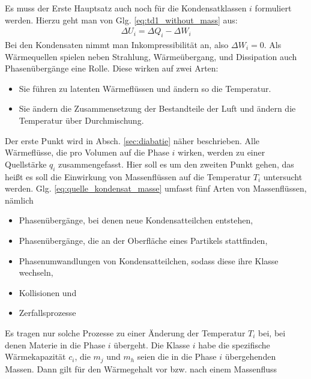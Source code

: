 \documentclass{book}
\begin{document}
Es muss der Erste Hauptsatz auch noch für die Kondensatklassen $i$ formuliert werden. Hierzu geht man von Glg. \eqref{eq:td1_without_mass} aus:
%
\begin{eqnarray}
\Delta U_i = \Delta Q_i - \Delta W_i
\end{eqnarray}
%
Bei den Kondensaten nimmt man Inkompressibilität an, also $\Delta W_i = 0$. Als Wärmequellen spielen neben Strahlung, Wärmeübergang, und Dissipation auch Phasenübergänge eine Rolle. Diese wirken auf zwei Arten:
%
\begin{itemize}
\item Sie führen zu latenten Wärmeflüssen und ändern so die Temperatur.
\item Sie ändern die Zusammensetzung der Bestandteile der Luft und ändern die Temperatur über Durchmischung.
\end{itemize}
%
Der erste Punkt wird in Absch. \ref{sec:diabatie} näher beschrieben. Alle Wärmeflüsse, die pro Volumen auf die Phase $i$ wirken, werden zu einer Quellstärke $q_i$ zusammengefasst. Hier soll es um den zweiten Punkt gehen, das heißt es soll die Einwirkung von Massenflüssen auf die Temperatur $T_i$ untersucht werden. Glg. \eqref{eq:quelle_kondensat_masse} umfasst fünf Arten von Massenflüssen, nämlich
%
\begin{itemize}
\item Phasenübergänge, bei denen neue Kondensatteilchen entstehen,
\item Phasenübergänge, die an der Oberfläche eines Partikels stattfinden,
\item Phasenumwandlungen von Kondensatteilchen, sodass diese ihre Klasse wechseln,
\item Kollisionen und
\item Zerfallsprozesse 
\end{itemize}
%
Es tragen nur solche Prozesse zu einer Änderung der Temperatur $T_i$ bei, bei denen Materie in die Phase $i$ übergeht. Die Klasse $i$ habe die spezifische Wärmekapazität $c_i$, die $m_j$ und $m_h$ seien die in die Phase $i$ übergehenden Massen. Dann gilt für den Wärmegehalt vor bzw. nach einem Massenfluss
%
\end{document}
